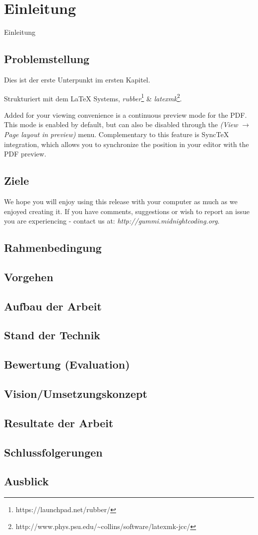 \chapter{Einleitung}
Einleitung

\section{Problemstellung}

Dies ist der erste Unterpunkt im ersten Kapitel.

Strukturiert mit dem {\LaTeX} Systems, \emph{rubber}\footnote{https://launchpad.net/rubber/} \& \emph{latexmk}\footnote{http://www.phys.psu.edu/{\textasciitilde}collins/software/latexmk-jcc/}. 

Added for your viewing convenience is a continuous preview mode for the PDF. This mode is enabled by default, but can also be disabled through the \emph{(View $\rightarrow$ Page layout in preview)} menu. Complementary to this feature is SyncTeX integration, which allows you to synchronize the position in your editor with the PDF preview. 

\section{Ziele}
We hope you will enjoy using this release with your \gls{computer} as much as we enjoyed creating it. If you have comments, suggestions or wish to report an issue you are experiencing - contact us at: \emph{http://gummi.midnightcoding.org}.

\section{Rahmenbedingung}

\section{Vorgehen}

\section{Aufbau der Arbeit}

\section{Stand der Technik}

\section{Bewertung (Evaluation)}

\section{Vision/Umsetzungskonzept}

\section{Resultate der Arbeit}

\section{Schlussfolgerungen}

\section{Ausblick}